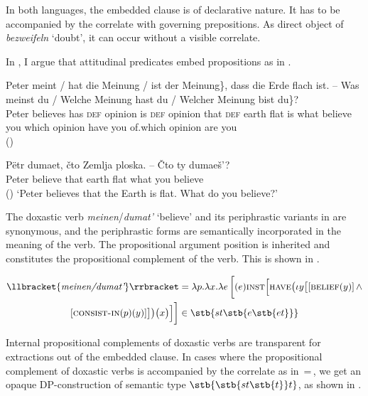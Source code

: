\documentclass[output=paper]{langscibook}
\begin{document}
\noindent In both languages, the embedded clause is of declarative nature. It has to be accompanied by the correlate with governing prepositions. As direct object of \textit{bezweifeln} `doubt', it can occur without a visible correlate.

In \citet{Zimmermann2019a}, I argue that attitudinal predicates embed propositions as in .

\ea \label{ex:zimmermann:33}
    \ea \gll Peter \minsp{\{} meint / hat die Meinung / ist der Meinung\}, dass die Erde flach ist. -- \minsp{\{} Was meinst du / Welche Meinung hast du / Welcher Meinung bist du\}? \label{ex:zimmermann:33a} \\
    Peter {} believes {} has \textsc{def} opinion {} is \textsc{def} opinion that \textsc{def} earth flat is {} {} what believe you {} which opinion have you {} of.which opinion are you\\ \hfill ()

    \ex \gll Pëtr dumaet, čto Zemlja ploska. -- Čto ty dumaeš'? \\
    Peter believe that earth flat {} what you believe\\ \hfill ()
    \z
    \glt `Peter believes that the Earth is flat. What do you believe?'
\z

\noindent The doxastic verb \textit{meinen}/\textit{dumat'} `believe' and its periphrastic variants in  are synonymous, and the periphrastic forms are semantically incorporated in the meaning of the verb. The propositional argument position is inherited and constitutes the propositional complement of the verb. This is shown in .

\begin{multline}\label{ex:zimmermann:34}
\llbracket\{\textit{meinen/dumat'}\}\rrbracket = \lambda p . \lambda x . \lambda e \, \bigg[(e) \textsc{inst} \Big[\textsc{have} \big(\iota y \big[[\textsc{belief} (y)] \, \wedge\\ [\textsc{consist-in} (p) (y)]\big]\big) \big(x\big)\Big]\bigg] \in \stb{st\stb{e\stb{et}}}
\end{multline}

\noindent Internal propositional complements of doxastic verbs are transparent for extractions out of the embedded clause. In cases where the propositional complement of doxastic verbs is accompanied by the correlate as in \,=\,, we get an opaque DP-construction of semantic type $\stb{\stb{st\stb{t}}t}$, as shown in .
\end{document}

